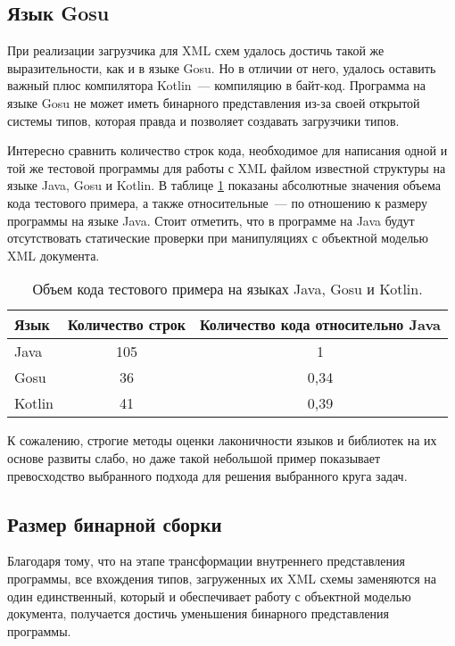\subsection{Язык Gosu}\label{xml-gosu-result}
При реализации загрузчика для XML схем удалось достичь такой же выразительности, как и в языке Gosu.
Но в отличии от него, удалось оставить важный плюс компилятора Kotlin~--- компиляцию в байт-код.
Программа на языке Gosu не может иметь бинарного представления из-за своей открытой системы типов,
которая правда и позволяет создавать загрузчики типов.

Интересно сравнить количество строк кода, необходимое для написания одной и той же тестовой программы для работы с XML файлом известной структуры на языке Java, Gosu и Kotlin.
В таблице \ref{tab:comparation_java_gosu_kotlin} показаны абсолютные значения объема кода тестового примера, а также относительные~--- по отношению к размеру программы на языке Java.
Стоит отметить, что в программе на Java будут отсутствовать статические проверки при манипуляциях с объектной моделью XML документа.

\begin{table}[!h]\begin{center}
\begin{center}
    \begin{tabular}{ | l | c | c | }
    \hline
    Язык 	& Количество строк & Количество кода относительно Java \\ \hline
    Java 	& 105 	& 1 \\ \hline
    Gosu   	& 36 	& 0,34  \\ \hline
    Kotlin 	& 41 	& 0,39 \\
    \hline
    \end{tabular}
\end{center}
\caption{Объем кода тестового примера на языках Java, Gosu и Kotlin.}
\label{tab:comparation_java_gosu_kotlin}
\end{center}
\end{table}

К сожалению, строгие методы оценки лаконичности языков и библиотек на их основе развиты слабо, но даже такой небольшой пример показывает превосходство выбранного подхода для решения выбранного круга задач.

\subsection{Размер бинарной сборки}
Благодаря тому, что на этапе трансформации внутреннего представления программы, все вхождения типов, загруженных их XML схемы заменяются на один единственный, который и обеспечивает работу с объектной моделью документа, получается достичь уменьшения бинарного представления программы.

